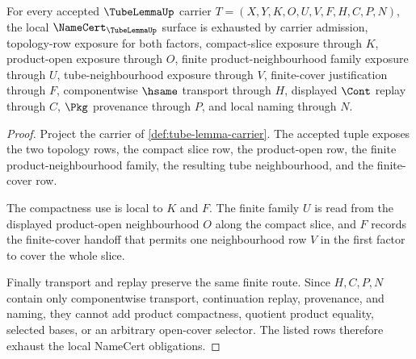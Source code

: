 \begin{theorem}
\label{thm:tube-lemma-namecert-obligations}
For every accepted $\TubeLemmaUp$ carrier $T=(X,Y,K,O,U,V,F,H,C,P,N)$, the local $\NameCert_{\TubeLemmaUp}$ surface is exhausted by carrier admission, topology-row exposure for both factors, compact-slice exposure through $K$, product-open exposure through $O$, finite product-neighbourhood family exposure through $U$, tube-neighbourhood exposure through $V$, finite-cover justification through $F$, componentwise $\hsame$ transport through $H$, displayed $\Cont$ replay through $C$, $\Pkg$ provenance through $P$, and local naming through $N$.
\end{theorem}
\begin{proof}
Project the carrier of \autoref{def:tube-lemma-carrier}. The accepted tuple exposes the two topology rows, the compact slice row, the product-open row, the finite product-neighbourhood family, the resulting tube neighbourhood, and the finite-cover row.

The compactness use is local to $K$ and $F$. The finite family $U$ is read from the displayed product-open neighbourhood $O$ along the compact slice, and $F$ records the finite-cover handoff that permits one neighbourhood row $V$ in the first factor to cover the whole slice.

Finally transport and replay preserve the same finite route. Since $H,C,P,N$ contain only componentwise transport, continuation replay, provenance, and naming, they cannot add product compactness, quotient product equality, selected bases, or an arbitrary open-cover selector. The listed rows therefore exhaust the local NameCert obligations.
\end{proof}


\begin{closurestatus}{\TubeLemmaUp}
  \theoryclosure{\seedClosure}
  \formalstatus{\unformalizedV}
\end{closurestatus}
